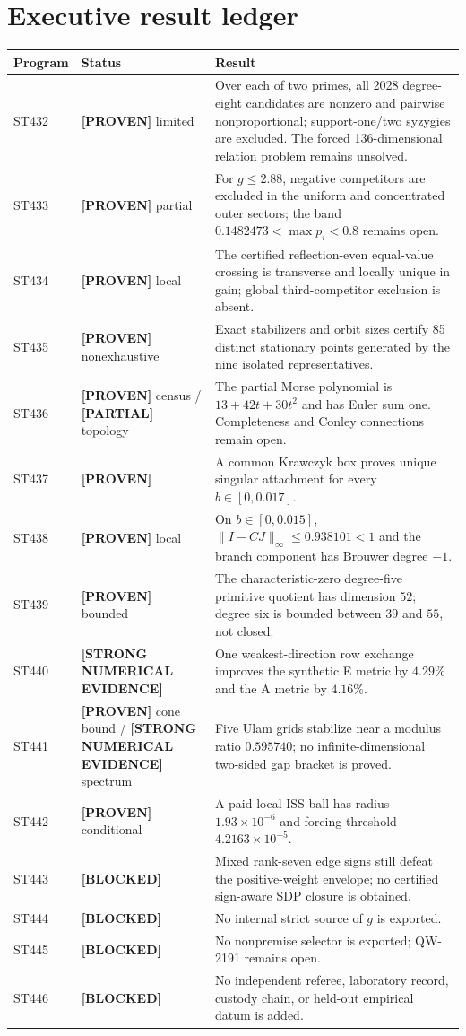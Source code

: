 \documentclass[11pt,a4paper]{article}
\newcommand{\Proven}{\textcolor{green!38!black}{\textbf{[PROVEN]}}}
\newcommand{\Evidence}{\textcolor{orange!80!black}{\textbf{[STRONG NUMERICAL EVIDENCE]}}}
\newcommand{\Partial}{\textcolor{orange!80!black}{\textbf{[PARTIAL]}}}
\newcommand{\Blocked}{\textcolor{red!65!black}{\textbf{[BLOCKED]}}}
\begin{document}
\section{Executive result ledger}
\small
\begin{longtable}{>{\raggedright\arraybackslash}p{}>{\raggedright\arraybackslash}p{}>{\raggedright\arraybackslash}p{}}
\toprule Program&Status&Result\\\midrule\endhead
ST432&\Proven{} limited&Over each of two primes, all 2028 degree-eight candidates are nonzero and pairwise nonproportional; support-one/two syzygies are excluded.  The forced 136-dimensional relation problem remains unsolved.\\
ST433&\Proven{} partial&For $g\le2.88$, negative competitors are excluded in the uniform and concentrated outer sectors; the band $0.1482473<\max p_i<0.8$ remains open.\\
ST434&\Proven{} local&The certified reflection-even equal-value crossing is transverse and locally unique in gain; global third-competitor exclusion is absent.\\
ST435&\Proven{} nonexhaustive&Exact stabilizers and orbit sizes certify 85 distinct stationary points generated by the nine isolated representatives.\\
ST436&\Proven{} census / \Partial{} topology&The partial Morse polynomial is $13+42t+30t^2$ and has Euler sum one.  Completeness and Conley connections remain open.\\
ST437&\Proven&A common Krawczyk box proves unique singular attachment for every $b\in[0,0.017]$.\\
ST438&\Proven{} local&On $b\in[0,0.015]$, $\|I-CJ\|_\infty\le0.938101<1$ and the branch component has Brouwer degree $-1$.\\
ST439&\Proven{} bounded&The characteristic-zero degree-five primitive quotient has dimension $52$; degree six is bounded between $39$ and $55$, not closed.\\
ST440&\Evidence&One weakest-direction row exchange improves the synthetic E metric by $4.29\%$ and the A metric by $4.16\%$.\\
ST441&\Proven{} cone bound / \Evidence{} spectrum&Five Ulam grids stabilize near a modulus ratio $0.595740$; no infinite-dimensional two-sided gap bracket is proved.\\
ST442&\Proven{} conditional&A paid local ISS ball has radius $1.93\times10^{-6}$ and forcing threshold $4.2163\times10^{-5}$.\\
ST443&\Blocked&Mixed rank-seven edge signs still defeat the positive-weight envelope; no certified sign-aware SDP closure is obtained.\\
ST444&\Blocked&No internal strict source of $g$ is exported.\\
ST445&\Blocked&No nonpremise selector is exported; QW-2191 remains open.\\
ST446&\Blocked&No independent referee, laboratory record, custody chain, or held-out empirical datum is added.\\
\bottomrule
\end{longtable}
\normalsize
\end{document}
